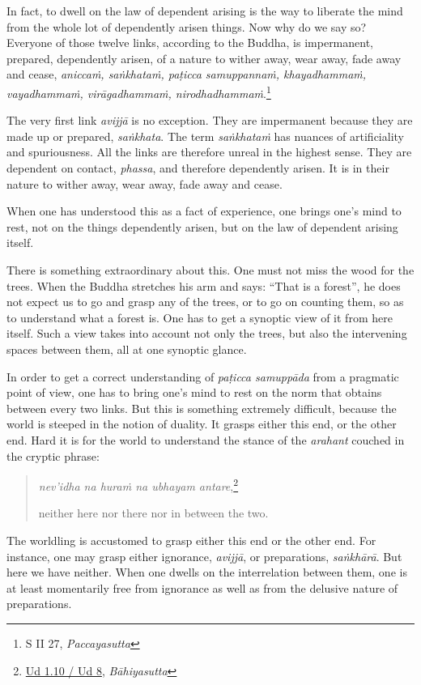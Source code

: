 In fact, to dwell on the law of dependent arising is the way to liberate the mind from the whole lot of dependently arisen things. Now why do we say so? Everyone of those twelve links, according to the Buddha, is impermanent, prepared, dependently arisen, of a nature to wither away, wear away, fade away and cease, \emph{aniccaṁ, saṅkhataṁ, paṭicca samuppannaṁ, khayadhammaṁ, vayadhammaṁ, virāgadhammaṁ, nirodhadhammaṁ}.\footnote{S II 27, \emph{Paccayasutta}}

The very first link \emph{avijjā} is no exception. They are impermanent because they are made up or prepared, \emph{saṅkhata}. The term \emph{saṅkhataṁ} has nuances of artificiality and spuriousness. All the links are therefore unreal in the highest sense. They are dependent on contact, \emph{phassa}, and therefore dependently arisen. It is in their nature to wither away, wear away, fade away and cease.

When one has understood this as a fact of experience, one brings one's mind to rest, not on the things dependently arisen, but on the law of dependent arising itself.

There is something extraordinary about this. One must not miss the wood for the trees. When the Buddha stretches his arm and says: ``That is a forest'', he does not expect us to go and grasp any of the trees, or to go on counting them, so as to understand what a forest is. One has to get a synoptic view of it from here itself. Such a view takes into account not only the trees, but also the intervening spaces between them, all at one synoptic glance.

In order to get a correct understanding of \emph{paṭicca samuppāda} from a pragmatic point of view, one has to bring one's mind to rest on the norm that obtains between every two links. But this is something extremely difficult, because the world is steeped in the notion of duality. It grasps either this end, or the other end. Hard it is for the world to understand the stance of the \emph{arahant} couched in the cryptic phrase:

\begin{quote}
\emph{nev'idha na huraṁ na ubhayam antare},\footnote{\href{https://suttacentral.net/ud1.10/pli/ms}{Ud 1.10 / Ud 8}, \emph{Bāhiyasutta}}

neither here nor there nor in between the two.
\end{quote}

The worldling is accustomed to grasp either this end or the other end. For instance, one may grasp either ignorance, \emph{avijjā}, or preparations, \emph{saṅkhārā}. But here we have neither. When one dwells on the interrelation between them, one is at least momentarily free from ignorance as well as from the delusive nature of preparations.

